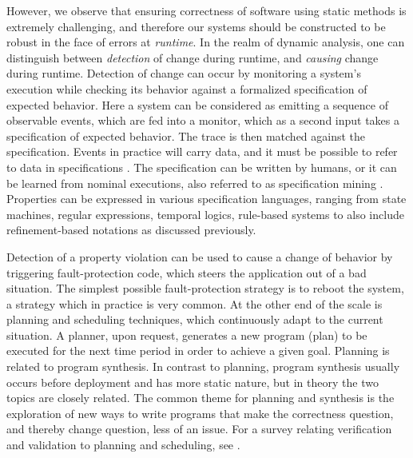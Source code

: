 However, we observe that ensuring correctness of software using static methods is extremely challenging, and therefore our systems should be constructed to be robust in the face of errors at {\em runtime}. 
%
In the realm of dynamic analysis, one can distinguish between {\em detection} of change during runtime, and {\em causing} change during runtime. Detection of change can occur by monitoring a system's execution while checking its behavior against a formalized specification of expected behavior. Here a system can be considered as emitting a sequence of observable events, which are fed into a monitor, which as a second input takes a specification of expected behavior. The trace is then matched against the specification. Events in practice will
carry data, and it must be possible to refer to data in specifications  \cite{havelund-isola-2014}. The specification can be written by humans, or it can be learned from nominal executions, also referred to as specification mining \cite{IsbernerHS14}. Properties can be expressed in various specification languages, ranging from state machines, regular expressions, temporal logics, rule-based systems to also include refinement-based notations as discussed previously.

Detection of a property violation can be used to cause a change
of behavior by triggering fault-protection code, which steers the application out of a bad situation. The simplest possible fault-protection strategy is to reboot the system, a strategy which in practice
is very common. At the other end of the scale is planning and scheduling techniques, which continuously adapt to the current situation. A planner, upon request, generates a new program (plan) to be executed for the next time period in order to achieve a given goal.  Planning is related to program synthesis. In contrast to planning, program synthesis usually occurs before deployment and has more static nature, but in theory the two topics are closely related. The common theme for planning and synthesis is the exploration of new ways to write programs that make the correctness question, and thereby change question, less of an issue. For a survey relating verification and validation to planning and scheduling, see \cite{bensalem-havelund-orlandini-vvps-2014}. 



  
